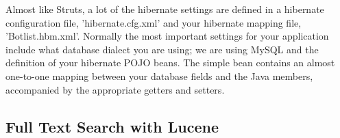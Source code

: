 Almost like Struts, a lot of the hibernate settings 
are defined in a hibernate configuration file, 'hibernate.cfg.xml' 
and your hibernate mapping file, 'Botlist.hbm.xml'. 
Normally the most important settings for your application 
include what database dialect you are using; we are using MySQL 
and the definition of your hibernate POJO beans. 
The simple bean contains an almost one-to-one mapping between 
your database fields and the Java members, accompanied by 
the appropriate getters and setters.

\subsection{Full Text Search with Lucene}
